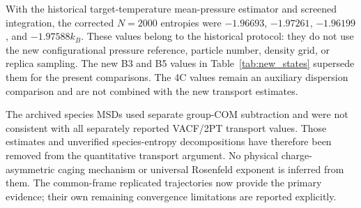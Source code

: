 \documentclass[aps,pre,twocolumn,superscriptaddress,floatfix]{revtex4-2}
\begin{document}
With the historical target-temperature mean-pressure estimator and screened integration, the corrected $N=2000$ entropies were $-1.96693$, $-1.97261$, $-1.96199$, and $-1.97588k_B$. These values belong to the historical protocol: they do not use the new configurational pressure reference, particle number, density grid, or replica sampling. The new B3 and B5 values in Table~\ref{tab:new_states} supersede them for the present comparisons. The 4C values remain an auxiliary dispersion comparison and are not combined with the new transport estimates.

The archived species MSDs used separate group-COM subtraction and were not consistent with all separately reported VACF/2PT transport values. Those estimates and unverified species-entropy decompositions have therefore been removed from the quantitative transport argument. No physical charge-asymmetric caging mechanism or universal Rosenfeld exponent is inferred from them. The common-frame replicated trajectories now provide the primary evidence; their own remaining convergence limitations are reported explicitly.
\end{document}
